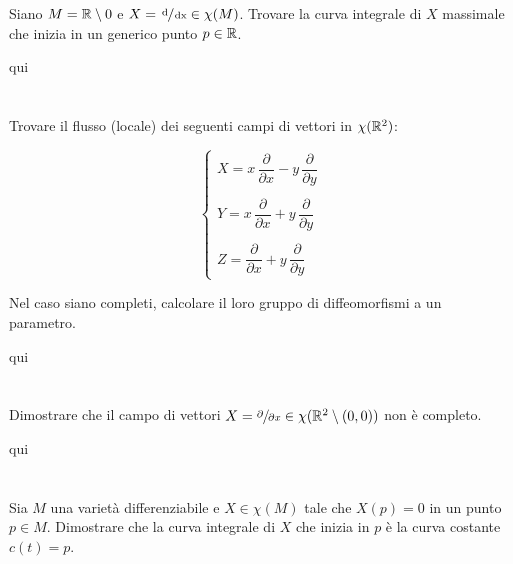\begin{tcolorbox}
	Siano $ M = \mathbb{R} \setminus 0 $ e $ X = \sfrac{\operatorname{d}}{\operatorname{dx}} \in \chi(M) $. Trovare la curva integrale di $ X $ massimale che inizia in un generico punto $ p \in \mathbb{R} $.
\end{tcolorbox}

qui

\tocless\section{}\label{es2-30}

\begin{tcolorbox}
	Trovare il flusso (locale) dei seguenti campi di vettori in $ \chi(\mathbb{R}^{2}) $:
	
	\begin{equation}
		\begin{cases}
			X = x \, \dfrac{\partial}{\partial x} - y \, \dfrac{\partial}{\partial y}\\\\
			Y = x \, \dfrac{\partial}{\partial x} + y \, \dfrac{\partial}{\partial y}\\\\
			Z = \dfrac{\partial}{\partial x} + y \, \dfrac{\partial}{\partial y}
		\end{cases}
	\end{equation}

	Nel caso siano completi, calcolare il loro gruppo di diffeomorfismi a un parametro.
\end{tcolorbox}

qui

\tocless\section{}\label{es2-31}

\begin{tcolorbox}
	Dimostrare che il campo di vettori $ X = \sfrac{\partial}{\partial x} \in \chi(\mathbb{R}^{2} \setminus (0,0)) $ non è completo.
\end{tcolorbox}

qui

\tocless\section{}\label{es2-32}

\begin{tcolorbox}
	Sia $ M $ una varietà differenziabile e $ X \in \chi(M) $ tale che $ X(p) = 0 $ in un punto $ p \in M $. Dimostrare che la curva integrale di $ X $ che inizia in $ p $ è la curva costante $ c(t)=p $.
\end{tcolorbox}

